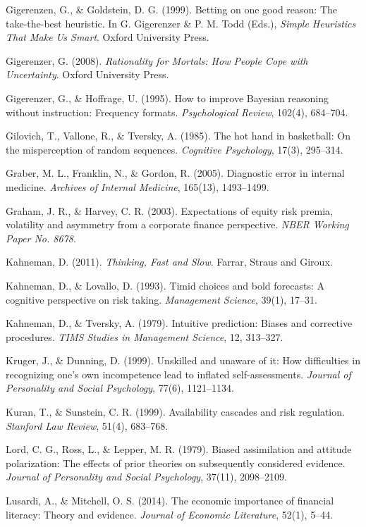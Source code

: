 \documentclass[12pt, letterpaper]{article}
\begin{document}
Gigerenzen, G., \& Goldstein, D. G. (1999). Betting on one good reason: The take-the-best heuristic. In G. Gigerenzer \& P. M. Todd (Eds.), \textit{Simple Heuristics That Make Us Smart}. Oxford University Press.

Gigerenzer, G. (2008). \textit{Rationality for Mortals: How People Cope with Uncertainty}. Oxford University Press.

Gigerenzer, G., \& Hoffrage, U. (1995). How to improve Bayesian reasoning without instruction: Frequency formats. \textit{Psychological Review}, 102(4), 684--704.

Gilovich, T., Vallone, R., \& Tversky, A. (1985). The hot hand in basketball: On the misperception of random sequences. \textit{Cognitive Psychology}, 17(3), 295--314.

Graber, M. L., Franklin, N., \& Gordon, R. (2005). Diagnostic error in internal medicine. \textit{Archives of Internal Medicine}, 165(13), 1493--1499.

Graham, J. R., \& Harvey, C. R. (2003). Expectations of equity risk premia, volatility and asymmetry from a corporate finance perspective. \textit{NBER Working Paper No. 8678}.

Kahneman, D. (2011). \textit{Thinking, Fast and Slow}. Farrar, Straus and Giroux.

Kahneman, D., \& Lovallo, D. (1993). Timid choices and bold forecasts: A cognitive perspective on risk taking. \textit{Management Science}, 39(1), 17--31.

Kahneman, D., \& Tversky, A. (1979). Intuitive prediction: Biases and corrective procedures. \textit{TIMS Studies in Management Science}, 12, 313--327.

Kruger, J., \& Dunning, D. (1999). Unskilled and unaware of it: How difficulties in recognizing one's own incompetence lead to inflated self-assessments. \textit{Journal of Personality and Social Psychology}, 77(6), 1121--1134.

Kuran, T., \& Sunstein, C. R. (1999). Availability cascades and risk regulation. \textit{Stanford Law Review}, 51(4), 683--768.

Lord, C. G., Ross, L., \& Lepper, M. R. (1979). Biased assimilation and attitude polarization: The effects of prior theories on subsequently considered evidence. \textit{Journal of Personality and Social Psychology}, 37(11), 2098--2109.

Lusardi, A., \& Mitchell, O. S. (2014). The economic importance of financial literacy: Theory and evidence. \textit{Journal of Economic Literature}, 52(1), 5--44.
\end{document}
